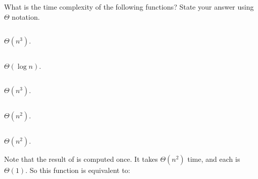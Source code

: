 \begin{prob}
    What is the time complexity of the following functions? State your answer using
    $\Theta$ notation.

    \begin{subprobset}

        \begin{subprob}
            \inputminted{python}{\thisdir/include/part_a.py}

            \begin{soln}
                $\Theta(n^3)$.
            \end{soln}
        \end{subprob}

        \begin{subprob}
            \inputminted{python}{\thisdir/include/part_b.py}

            \begin{soln}
                $\Theta(\log n)$.
            \end{soln}
        \end{subprob}

        \begin{subprob}
            \inputminted{python}{\thisdir/include/part_c.py}

            \begin{soln}
                $\Theta(n^3)$.
            \end{soln}
        \end{subprob}

        \begin{subprob}
            \inputminted{python}{\thisdir/include/part_d.py}

            \begin{soln}
                $\Theta(n^2)$.
            \end{soln}
        \end{subprob}

        \begin{subprob}
            \inputminted{python}{\thisdir/include/part_e.py}

            \begin{soln}
                $\Theta(n^2)$.

                Note that the result of  is computed once.
                It takes $\Theta(n^2)$ time, and each  is $\Theta(1)$.
                So this function is equivalent to:

                \inputminted{python}{\thisdir/include/part_e_soln.py}
            \end{soln}
        \end{subprob}

    \end{subprobset}

\end{prob}
